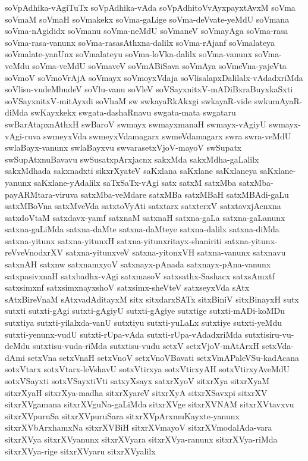 {soVpAdhika-vAgiTuTx
soVpAdhika-vAda
soVpAdhitoVvAyxpayxtAvxM
soVma
soVmaM
soVmaH
soVmakekx
soVma-gaLige
soVma-deVvate-yeMdU
soVmana
soVma-nAgididx
soVmanu
soVma-neMdU
soVmaneV
soVmayAga
soVma-rasa
soVma-rasa-vanunx
soVma-rasasAthxna-dalilx
soVma-rAjanf
soVmalateya
soVmalate-yanUnx
soVmalateyu
soVma-loVka-dalilx
soVma-vanunx
soVma-veMdu
soVma-veMdU
soVmaveV
soVmABiSava
soVmAya
soVmeVna-yajeVta
soVmoV
soVmoVrAjA
soVmayx
soVmoyxVdaja
soVlisalapxDalilalx-vAdadxriMda
soVlisu-vudeMbudeV
soVlu-vanu
soVleV
soVSayxnitxV-mADiBxraBuyxkaSxti
soVSayxnitxV-mitAyxdi
soVhaM
sw
swkayaRkAkxgi
swkayaR-vide
swkumAyaR-diMda
swKayxkekx
swgata-dashaRnavu
swgata-mata
swgataru
swBarAtapxnAthxH
swBaroV
swmayx
swmayxmanaH
swmayx-vAgiyU
swmayx-vAgi-ruva
swmeyxVda
swmeyxVdamagarx
swmeVdamagarx
swra
swra-veMdU
swlaBayx-vanunx
swlaBayxvu
swvarasetxVjoV-mayoV
swSupatx
swSupAtxnuBavavu
swSusatxpArxjacnx
sakxMda
sakxMdha-gaLalilx
sakxMdhada
sakxnadxti
sikxrXyateV
saKxlana
saKxlane
saKxlaneya
saKxlane-yanunx
saKxlane-yAdalilx
saTxSaTx-vAgi
satx
satxM
satxMba
satxMba-payARMtara-viruva
satxMba-veMdare
satxMBa
satxMBaH
satxMBAdi-gaLu
satxMBoVna
satxMveVda
satxtoVyAti
satxtarx
satxterxV
satxtavxjAcnxna
satxdoVtaM
satxdavx-yamf
satxnaM
satxnaH
satxna-gaLa
satxna-gaLanunx
satxna-gaLiMda
satxna-daMte
satxna-daMteye
satxna-dalilx
satxna-diMda
satxna-yitunx
satxna-yitunxH
satxna-yitunxritayx-shaniriti
satxna-yitunx-reVveVnodxrXV
satxna-yitunxveV
satxna-yitonxVH
satxna-vanunx
satxnavu
satxnAH
satxnw
satxnamxyoV
satxnayx-pAnada
satxnayx-pAna-vanunx
satxpasivxnaH
satxbadhx-vAgi
satxmasoV
satxsathx-Sashacx
satxsAmxtf
satxsimxnf
satxsimxnayxshoV
satxsimx-sheVteV
satxseyxVda
sAtx
sAtxBireVnaM
sAtxvadAditayxM
sitx
sitxdarxSATx
sitxBiniV
sitxBinayxH
sutx
sutxti
sutxti-gAgi
sutxti-gAgiyU
sutxti-gAgiye
sutxtige
sutxti-mADi-koMDu
sutxtiya
sutxti-yilalxda-vanU
sutxtiyu
sutxti-yuLaLx
sutxtiye
sutxti-yeMdu
sutxti-yenunx-vudU
sutxti-rUpa-vAda
sutxti-rUpa-vAdadxriMda
sutxtisiru-vu-deMdu
sutxtisu-vuda-riMda
sutxtisu-vudu
setxV
setxVjoV-mAtArxH
setxVda-dAmi
setxVna
setxVnaH
setxVnoV
setxVnoVBavati
setxVmAPaleVSu-kadAcana
sotxVtarx
sotxVtarx-leVshavU
sotxVtirxya
sotxVtirxyAH
sotxVtirxyAveMdU
sotxVSayxti
sotxVSayxtiVti
satxyXsayx
satxrXyoV
sitxrXya
sitxrXyaM
sitxrXyaH
sitxrXya-madha
sitxrXyareV
sitxrXyA
sitxrXSavxpi
sitxrXV
sitxrXVgamana
sitxrXVguNa-gaLiMda
sitxrXVge
sitxrXVNAM
sitxrXVtavxvu
sitxrXVpuruSa
sitxrXVpuruSara
sitxrXVpArxmuKayxte-yanunx
sitxrXVbArxhamxNa
sitxrXVBiH
sitxrXVmayoV
sitxrXVmodalAda-vara
sitxrXVya
sitxrXVyanunx
sitxrXVyara
sitxrXVya-ranunx
sitxrXVya-riMda
sitxrXVya-rige
sitxrXVyaru
sitxrXVyalilx
}
